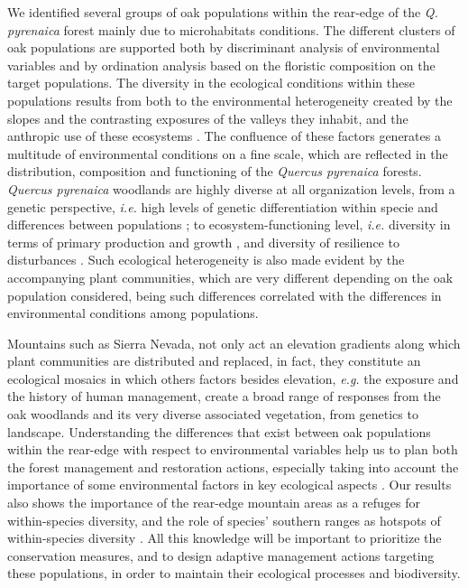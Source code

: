 We identified several groups of oak populations within the rear-edge of the \emph{Q. pyrenaica} forest mainly due to microhabitats conditions. The different clusters of oak populations are supported both by discriminant analysis of environmental variables and by ordination analysis based on the floristic composition on the target populations. The diversity in the ecological conditions within these populations results from both to the environmental heterogeneity created by the slopes and the contrasting exposures of the valleys they inhabit, and the anthropic use of these ecosystems \autocites[\emph{e.g.}][]{NavarroGonzalezetal2013WeightLanduse,PerezLuqueetal2020LanduseLegacies}. The confluence of these factors generates a multitude of environmental conditions on a fine scale, which are reflected in the distribution, composition and functioning of the \emph{Quercus pyrenaica} forests.
\emph{Quercus pyrenaica} woodlands are highly diverse at all organization levels, from a genetic perspective, \emph{i.e.} high levels of genetic differentiation within specie \autocite{ValbuenaCarabanaGil2013GeneticResilience} and differences between populations \autocite{ValbuenaCarabanaGil2011EvaluacionEstructura}; to ecosystem-functioning level, \emph{i.e.} diversity in terms of primary production and growth \autocite{PerezLuqueetal2015OntologicalSystem,AlcarazSeguraetal2016ChangesVegetation}, and diversity of resilience to disturbances \autocite[\emph{e.g.}][]{PerezLuqueetal2020LanduseLegacies}. Such ecological heterogeneity is also made evident by the accompanying plant communities, which are very different depending on the oak population considered, being such differences correlated with the differences in environmental conditions among populations.

Mountains such as Sierra Nevada, not only act an elevation gradients along which plant communities are distributed and replaced, in fact, they constitute an ecological mosaics in which others factors besides elevation, \emph{e.g.} the exposure and the history of human management, create a broad range of responses from the oak woodlands and its very diverse associated vegetation, from genetics to landscape. Understanding the differences that exist between oak populations within the rear-edge with respect to environmental variables help us to plan both the forest management and restoration actions, especially taking into account the importance of some environmental factors in key ecological aspects \autocites[\emph{e.g.} regeneration and growth,][]{GomezAparicioetal2008OakSeedling,PerezLuqueetal2020LanduseLegacies}. Our results also shows the importance of the rear-edge mountain areas as a refuges for within-species diversity, and the role of species' southern ranges as hotspots of within-species diversity \autocite{Jumpetal2010MonitoringManaging,HampeJump2011ClimateRelicts}. All this knowledge will be important to prioritize the conservation measures, and to design adaptive management actions targeting these populations, in order to maintain their ecological processes and biodiversity.

